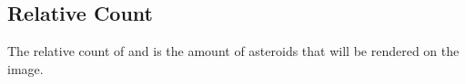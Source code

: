 \documentclass[letterpaper,10pt,english]{sphinxmanual}
\begin{document}
\subsection{Relative Count}
\label{\detokenize{quantities/material/relative_count:relative-count}}\label{\detokenize{quantities/material/relative_count::doc}}\label{\detokenize{quantities/material/relative_count:id1}}
\sphinxAtStartPar
The relative count of {\hyperref[\detokenize{celestial_bodies/trojan:id1}]{}} and {\hyperref[\detokenize{celestial_bodies/asteroid_belt:id1}]{}}
is the amount of asteroids that will be rendered on the {\hyperref[\detokenize{celestial_systems/stellar_system:id1}]{}} image.
\end{document}

